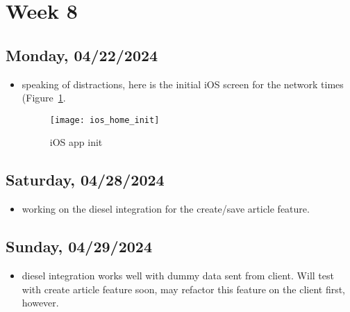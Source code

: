 \newpage
\section{Week 8}
\subsection*{Monday, 04/22/2024}
\begin{itemize}
    \item speaking of distractions, here is the initial iOS screen for the
        network times (Figure~\ref{fig:ios_home_init}. 
        \begin{figure}[ht]
            \centering
            \texttt{[image: ios\_home\_init]}
            \captionsetup{labelfont=bf, textfont=it}
            \caption{iOS app init}
            \label{fig:ios_home_init}
        \end{figure}
\end{itemize}

\subsection*{Saturday, 04/28/2024}
\begin{itemize}
    \item working on the diesel integration for the create/save article feature.
\end{itemize}

\subsection*{Sunday, 04/29/2024}
\begin{itemize}
    \item diesel integration works well with dummy data sent from client. Will
        test with create article feature soon, may refactor this feature on the 
        client first, however.
\end{itemize}
